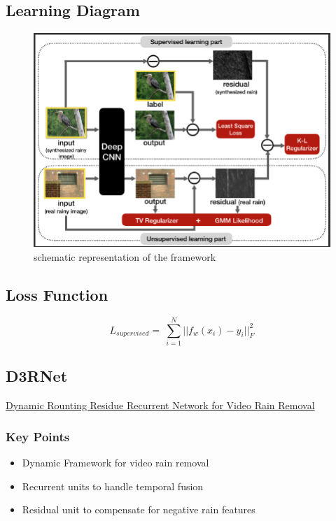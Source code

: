 \documentclass{article}
\begin{document}
\subsection{Learning Diagram}
\begin{figure}[H]
    \centering
    \includegraphics[width=\linewidth]{semi-supervised_SIRR}
    \caption{schematic representation of the framework}
\end{figure}

\subsection{Loss Function}

\begin{equation*}
    L_{supervised}=\    \sum_{i=1}^{N} \vert\vert f_{w}(x_i)-y_i \vert\vert_{F}^{2}
\end{equation*}



\subsection{D3RNet}
\href{http://www.icst.pku.edu.cn/struct/Pub%20Files/2019/ywh_tip19.pdf}{Dynamic Rounting Residue Recurrent Network for Video Rain Removal}
\subsubsection{Key Points}
\begin{itemize}
\item Dynamic Framework for video rain removal
\item Recurrent units to handle temporal fusion
\item Residual unit to compensate for negative rain features
\end{itemize}
\end{document}
